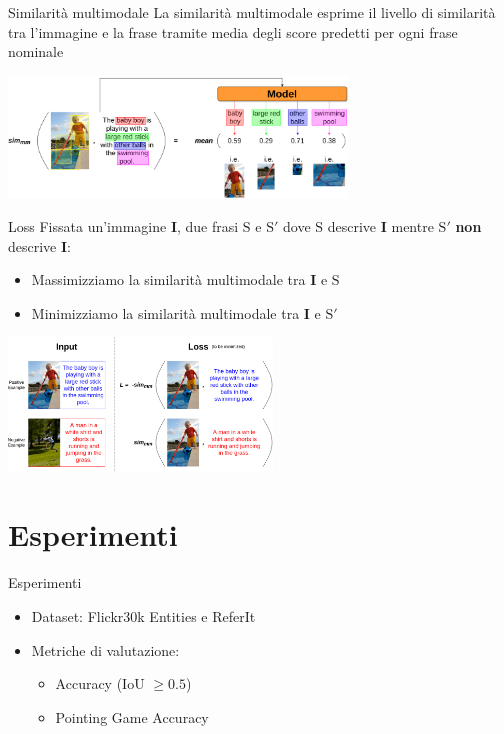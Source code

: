 \documentclass{beamer}
\begin{document}
\begin{frame}{Similarità multimodale}
  La similarità multimodale esprime il \alert{livello di similarità
  tra l'immagine e la frase} tramite media degli score
  predetti per ogni frase nominale
  
  \vspace{1cm}

  \centering
  \includegraphics[width=9cm]{images/sim-mm.png}
\end{frame}

\begin{frame}{Loss}
  Fissata un'immagine $\bm{I}$, due frasi $\text{S}$ e $\text{S}'$
  dove $\text{S}$ descrive $\bm{I}$ mentre $\text{S}'$ \textbf{non}
  descrive $\bm{I}$:
  \begin{itemize}
    \item \alert{Massimizziamo} la similarità multimodale tra $\bm{I}$
    e $\text{S}$
    \item \alert{Minimizziamo} la similarità multimodale tra $\bm{I}$
    e $\text{S}'$
  \end{itemize}
  
  \vspace{0.5cm}

  \centering
  \includegraphics[width=7cm]{images/loss.png}
\end{frame}

\section{Esperimenti}

\begin{frame}{Esperimenti}
  \begin{itemize}
    \item Dataset: \alert{Flickr30k Entities} e \alert{ReferIt}
    \item Metriche di valutazione:
    \begin{itemize}
      \item \alert{Accuracy} (IoU $\geq 0.5$)
      \item Pointing Game Accuracy
    \end{itemize}
  \end{itemize}
\end{frame}
\end{document}
